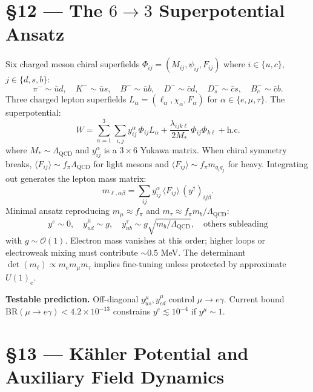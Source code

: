 \documentclass[11pt,a4paper]{article}
\newcommand{\Lqcd}{\Lambda_{\text{QCD}}}
\newcommand{\fpi}{f_\pi}
\newcommand{\mmu}{m_\mu}
\newcommand{\mtau}{m_\tau}
\begin{document}
\section*{\S 12 --- The $6\to 3$ Superpotential Ansatz}

Six charged meson chiral superfields $\Phi_{ij} = (M_{ij}, \psi_{ij}, F_{ij})$ where $i \in \{u,c\}$, $j \in \{d,s,b\}$:
\begin{equation}
\pi^- \sim \bar{u}d, \quad K^- \sim \bar{u}s, \quad B^- \sim \bar{u}b, \quad D^- \sim \bar{c}d, \quad D_s^- \sim \bar{c}s, \quad B_c^- \sim \bar{c}b.
\end{equation}
Three charged lepton superfields $L_\alpha = (\ell_\alpha, \chi_\alpha, F_\alpha)$ for $\alpha \in \{e,\mu,\tau\}$.  The superpotential:
\begin{equation}
W = \sum_{\alpha=1}^3 \sum_{i,j} y^\alpha_{ij}\,\Phi_{ij} L_\alpha + \frac{\lambda_{ijk\ell}}{2M_*}\,\Phi_{ij}\Phi_{k\ell} + \text{h.c.}
\end{equation}
where $M_* \sim \Lqcd$ and $y^\alpha_{ij}$ is a $3 \times 6$ Yukawa matrix.  When chiral symmetry breaks, $\langle F_{ij} \rangle \sim \fpi \Lqcd$ for light mesons and $\langle F_{ij} \rangle \sim \fpi m_{q_i q_j}$ for heavy.  Integrating out generates the lepton mass matrix:
\begin{equation}
m_{\ell,\alpha\beta} = \sum_{ij} y^\alpha_{ij}\,\langle F_{ij} \rangle\,(y^\dagger)_{ij\beta}.
\end{equation}
Minimal ansatz reproducing $\mmu \approx \fpi$ and $\mtau \approx \fpi m_b/\Lqcd$:
\begin{equation}
y^e \sim 0, \quad y^\mu_{ud} \sim g, \quad y^\tau_{ub} \sim g\sqrt{m_b/\Lqcd}, \quad \text{others subleading}
\end{equation}
with $g \sim \mathcal{O}(1)$.  Electron mass vanishes at this order; higher loops or electroweak mixing must contribute $\sim 0.5$ MeV.  The determinant $\det(m_\ell) \propto m_e \mmu \mtau$ implies fine-tuning unless protected by approximate $U(1)_e$.

\textbf{Testable prediction.}  Off-diagonal $y^\mu_{us}, y^\mu_{cd}$ control $\mu \to e\gamma$.  Current bound $\text{BR}(\mu \to e\gamma) < 4.2 \times 10^{-13}$ constrains $y^e \lesssim 10^{-4}$ if $y^\mu \sim 1$.

\section*{\S 13 --- K\"ahler Potential and Auxiliary Field Dynamics}
\end{document}
